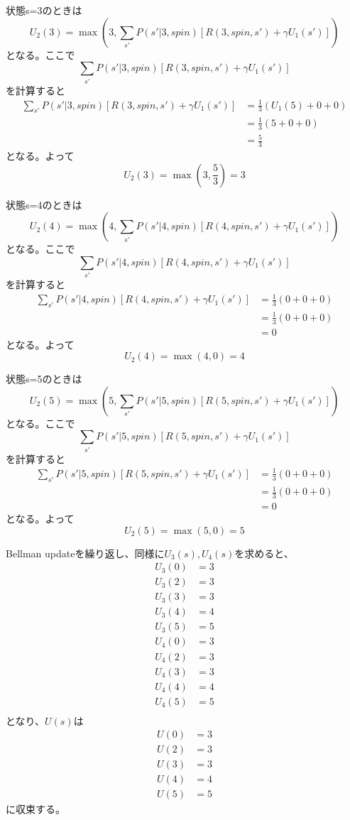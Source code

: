 \documentclass[a4paper,11pt,dvipdfmx]{jsarticle}
\begin{document}
状態s=3のときは
\[U_2(3)=\max(3, \sum_{s'}P(s'|3,spin)[R(3,spin,s')+\gamma U_1(s')])\]
となる。ここで
\[\sum_{s'}P(s'|3,spin)[R(3,spin,s')+\gamma U_1(s')]\]
を計算すると
\begin{align*}
    \sum_{s'}P(s'|3,spin)[R(3,spin,s')+\gamma U_1(s')] &= \frac{1}{3}(U_1(5)+0+0) \\
                                                     &= \frac{1}{3}(5+0+0) \\
                                                     &= \frac{5}{3}
\end{align*}
となる。よって
\[U_2(3)=\max(3,\frac{5}{3})=3\]

状態s=4のときは
\[U_2(4)=\max(4, \sum_{s'}P(s'|4,spin)[R(4,spin,s')+\gamma U_1(s')])\]
となる。ここで
\[\sum_{s'}P(s'|4,spin)[R(4,spin,s')+\gamma U_1(s')]\]
を計算すると
\begin{align*}
    \sum_{s'}P(s'|4,spin)[R(4,spin,s')+\gamma U_1(s')] &= \frac{1}{3}(0+0+0) \\
                                                     &= \frac{1}{3}(0+0+0) \\
                                                     &= 0
\end{align*}
となる。よって
\[U_2(4)=\max(4,0)=4\]

状態s=5のときは
\[U_2(5)=\max(5, \sum_{s'}P(s'|5,spin)[R(5,spin,s')+\gamma U_1(s')])\]
となる。ここで
\[\sum_{s'}P(s'|5,spin)[R(5,spin,s')+\gamma U_1(s')]\]
を計算すると
\begin{align*}
    \sum_{s'}P(s'|5,spin)[R(5,spin,s')+\gamma U_1(s')] &= \frac{1}{3}(0+0+0) \\
                                                     &= \frac{1}{3}(0+0+0) \\
                                                     &= 0
\end{align*}
となる。よって
\[U_2(5)=\max(5,0)=5\]

Bellman updateを繰り返し、同様に\(U_3(s),U_4(s)\)を求めると、
\begin{align*}
    U_3(0) &= 3 \\
    U_3(2) &= 3 \\
    U_3(3) &= 3 \\
    U_3(4) &= 4 \\
    U_3(5) &= 5 \\
    U_4(0) &= 3 \\
    U_4(2) &= 3 \\
    U_4(3) &= 3 \\
    U_4(4) &= 4 \\
    U_4(5) &= 5 \\
\end{align*}
となり、\(U(s)\)は
\begin{align*}
    U(0) &= 3 \\
    U(2) &= 3 \\
    U(3) &= 3 \\
    U(4) &= 4 \\
    U(5) &= 5
\end{align*}
に収束する。
\end{document}
